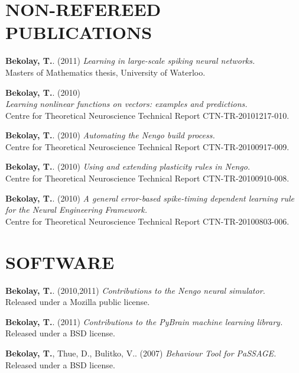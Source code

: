 \documentclass[line,margin]{res}
\begin{document}
\begin{resume}
\section{NON-REFEREED \\PUBLICATIONS}
  \textbf{Bekolay, T.}. (2011)
    {\sl Learning in large-scale spiking neural networks.} \\
    Masters of Mathematics thesis, University of Waterloo.

  \textbf{Bekolay, T.}. (2010) \\
    {\sl Learning nonlinear functions on vectors: examples and predictions.} \\
      Centre for Theoretical Neuroscience Technical Report CTN-TR-20101217-010.

  \textbf{Bekolay, T.}. (2010)
    {\sl Automating the Nengo build process.} \\
    Centre for Theoretical Neuroscience Technical Report CTN-TR-20100917-009.

  \textbf{Bekolay, T.}. (2010)
    {\sl Using and extending plasticity rules in Nengo.} \\
    Centre for Theoretical Neuroscience Technical Report CTN-TR-20100910-008.

  \textbf{Bekolay, T.}. (2010)
    {\sl A general error-based spike-timing dependent learning rule for the Neural Engineering Framework.} \\
    Centre for Theoretical Neuroscience Technical Report CTN-TR-20100803-006.

\section{SOFTWARE}
  \textbf{Bekolay, T.}. (2010,2011)
    {\sl Contributions to the Nengo neural simulator.} \\
    Released under a Mozilla public license.

  \textbf{Bekolay, T.}. (2011)
    {\sl Contributions to the PyBrain machine learning library.} \\
    Released under a BSD license.

  \textbf{Bekolay, T.}, Thue, D., Bulitko, V.. (2007)
    {\sl Behaviour Tool for PaSSAGE.} \\
    Released under a BSD license.

\end{resume}
\end{document}
